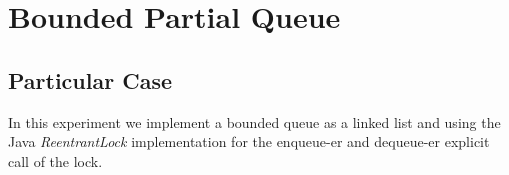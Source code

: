 


\section{\textbf{Bounded Partial Queue}}



\subsection{Particular Case}
\par
In this experiment we implement a bounded queue as a linked list and using the Java \textit{ReentrantLock} implementation for the enqueue-er and dequeue-er explicit call of the lock.
\par



